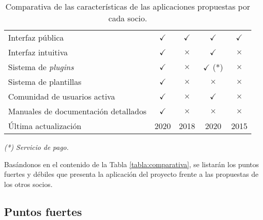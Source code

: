 \begin{table}[H]
\begin{tabular}{@{}lcccc@{}}
Interfaz pública & \cellcolor{green!25} {$\checkmark$} & \cellcolor{green!25} {$\checkmark$} & \cellcolor{green!25} {$\checkmark$} & \cellcolor{green!25} {$\checkmark$}\tabularnewline
Interfaz intuitiva & \cellcolor{green!25} {$\checkmark$} & \cellcolor{red!25} {$\times$} & \cellcolor{green!25} {$\checkmark$} & \cellcolor{red!25} {$\times$}\tabularnewline
Sistema de \emph{plugins} & \cellcolor{green!25} {$\checkmark$} & \cellcolor{red!25} {$\times$} & \cellcolor{green!25} {$\checkmark$} (*) & \cellcolor{red!25} {$\times$}\tabularnewline
Sistema de plantillas & \cellcolor{green!25} {$\checkmark$} & \cellcolor{red!25} {$\times$} & \cellcolor{red!25} {$\times$} & \cellcolor{red!25} {$\times$}\tabularnewline
Comunidad de usuarios activa & \cellcolor{green!25} {$\checkmark$} & \cellcolor{red!25} {$\times$} & \cellcolor{green!25} {$\checkmark$} & \cellcolor{red!25} {$\times$}\tabularnewline
Manuales de documentación detallados & \cellcolor{green!25} {$\checkmark$} & \cellcolor{red!25} {$\times$} & \cellcolor{red!25} {$\times$} & \cellcolor{red!25} {$\times$}\tabularnewline
Última actualización & 2020 & 2018 & 2020 & 2015\tabularnewline
\bottomrule
\end{tabular}
\caption{Comparativa de las características de las aplicaciones propuestas por cada socio.}
\end{table}

\emph{(*) Servicio de pago.}

Basándonos en el contenido de la Tabla \ref{tabla:comparativa}, se listarán los
puntos fuertes y débiles que presenta la aplicación del proyecto frente
a las propuestas de los otros socios.


\subsection{Puntos fuertes}

